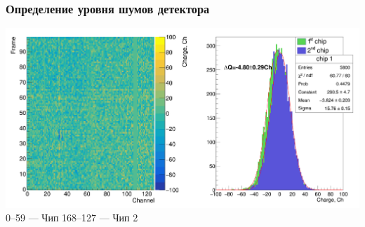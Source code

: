 \documentclass[14pt]{beamer}
\begin{document}
\begin{frame}[c]
\frametitle{Определение уровня шумов детектора}
	\includegraphics[width=1\linewidth]{Noise_no_filtering.png}
	 \hspace*{20pt}\tiny{0--59 --- Чип 1}\hspace*{30pt}\tiny{68--127 --- Чип 2}
\end{frame}
\end{document}
